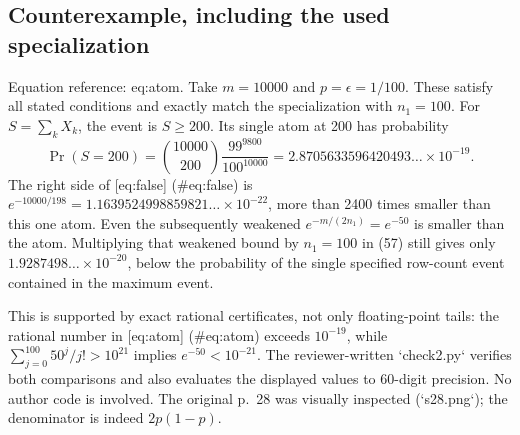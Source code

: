 \documentclass[10pt]{article}
\begin{document}
\subsection*{Counterexample, including the used specialization}
Equation reference: eq:atom. Take \(m=10000\) and \(p=\epsilon=1/100\). These satisfy all stated conditions and exactly match the specialization with \(n_1=100\). For \(S=\sum_kX_k\), the event is \(S\ge200\). Its single atom at 200 has probability \[
 \Pr(S=200)=\binom{10000}{200}\frac{99^{9800}}{100^{10000}}
 =2.8705633596420493\ldots\times10^{-19}.\] The right side of [eq:false] (\#eq:false) is \(e^{-10000/198}=1.1639524998859821\ldots\times10^{-22}\), more than 2400 times smaller than this one atom. Even the subsequently weakened \(e^{-m/(2n_1)}=e^{-50}\) is smaller than the atom. Multiplying that weakened bound by \(n_1=100\) in (57) still gives only \(1.9287498\ldots\times10^{-20}\), below the probability of the single specified row-count event contained in the maximum event.\par
This is supported by exact rational certificates, not only floating-point tails: the rational number in [eq:atom] (\#eq:atom) exceeds \(10^{-19}\), while \(\sum_{j=0}^{100}50^j/j!>10^{21}\) implies \(e^{-50}<10^{-21}\). The reviewer-written `check2.py` verifies both comparisons and also evaluates the displayed values to 60-digit precision. No author code is involved. The original p. 28 was visually inspected (`s28.png`); the denominator is indeed \(2p(1-p)\).\par
\end{document}

